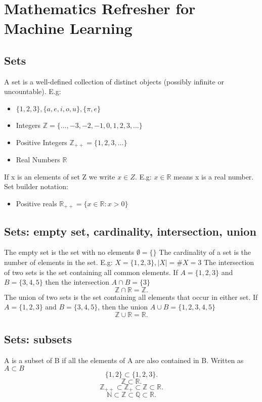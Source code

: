 \documentclass[a4paper]{article}
\newcommand{\R}{\mathbb{R}}
\newcommand{\Z}{\mathbb{Z}}
\newcommand{\N}{\mathbb{N}}
\newcommand{\Q}{\mathbb{Q}}
\newcommand{\0}{\mathbb{\emptyset}}
\begin{document}
	\section{Mathematics Refresher for Machine Learning}
	\subsection{Sets}
	A set is a well-defined collection of distinct objects (possibly infinite or uncountable).
	E.g:
	\begin{itemize}
		\item $\{1,2,3\}, \{a,e,i,o,u\}, \{\pi,e\}  $
		\item Integers $\Z = \{\ldots,-3,-2,-1,0,1,2,3,\ldots\}$
		\item Positive Integers $\Z_{++} = \{1,2,3,\ldots\} $
		\item Real Numbers $\R$
	\end{itemize}
	If x is an elements of set Z we write $x \in Z$.
	E.g: $x\in\R$ means x is a real number.
	Set builder notation:
	\begin{itemize}
		\item Positive reals $\R_{++} = \{x\in\R: x>0\} $
	\end{itemize}
	\subsection{Sets: empty set, cardinality, intersection, union}
	The empty set is the set with no elements $\0 = \{\} $
	The cardinality of a set is the number of elements in the set.
	E.g: $X = \{1,2,3\}, |X|=\#X=3$ 
	The intersection of two sets is the set containing all common elements.
	If $A = \{1,2,3\}$ and $B = \{3,4,5\}$ then the intersection $A\cap B = \{3\} $
	\[
		\Z \cap \R = \Z
	.\]
	The union of two sets is the set containing all elements that occur in either set.
	If $A = \{1,2,3\} $ and $B = \{3,4,5\} $, then the union $A \cup B = \{1,2,3,4,5\} $ 
	\[
		\Z \cup \R = \R
	.\]
	\subsection{Sets: subsets}
	A is a subset of B if all the elements of A are also contained in B.
	Written as $A \subset B$ 
	\[
		\{1,2\} \subset \{1,2,3\}
	.\]
	\[
		\Z \subset \R
	.\]
	\[
		\Z_{++} \subset \Z_+ \subset \Z \subset \R
	.\]
	\[
		\N \subset \Z \subset \Q \subset \R
	.\]
\end{document}
